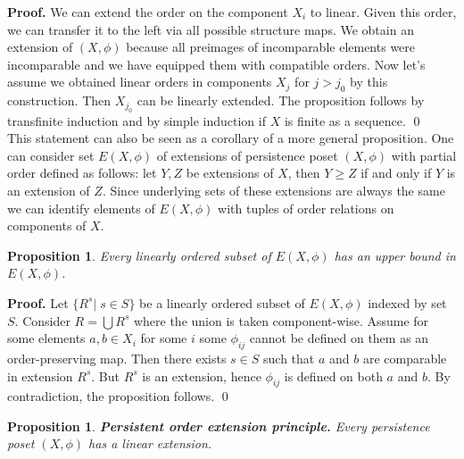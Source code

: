\documentclass[english,12pt]{article}
\newcounter{stmcounter}[section]
\numberwithin{equation}{section}
\newtheorem{proposition}[stmcounter]{Proposition}
\theoremstyle{definition}
\theoremstyle{remark}
\newenvironment{pf}{\noindent\textbf{Proof.}}{\qed}
\renewcommand{\geq}{\geqslant}
\begin{document}
\begin{pf}
  We can extend the order on the component $X_i$ to linear. Given this order, we can transfer it to the left via all possible structure maps. We obtain an extension of $(X,\phi)$ because all preimages of incomparable elements were incomparable and we have equipped them with compatible orders. Now let's assume we obtained linear orders in components $X_j$ for $j > j_0$ by this construction. Then $X_{j_0}$ can be linearly extended. The proposition follows by transfinite induction and by simple induction if $X$ is finite as a sequence.
\end{pf}\\

This statement can also be seen as a corollary of a more general proposition.
One can consider set $E(X,\phi)$ of extensions of persistence poset $(X,\phi)$ with partial order defined as follows: let $Y, Z$ be extensions of $X$, then $Y \geq Z$ if and only if $Y$ is an extension of $Z$. Since underlying sets of these extensions are always the same we can identify elements of $E(X,\phi)$ with tuples of order relations on components of $X$.

\begin{proposition}
  \label{Zorn_cond}
  Every linearly ordered subset of $E(X,\phi)$ has an upper bound in $E(X,\phi)$.
\end{proposition}

\begin{pf}
  Let $\{R^s|\;s \in S\}$ be a linearly ordered subset of $E(X,\phi)$ indexed by set $S$. Consider $R = \bigcup R^s$ where the union is taken component-wise. Assume for some elements $a, b \in X_i$ for some $i$ some $\phi_{ij}$ cannot be defined on them as an order-preserving map. Then there exists $s \in S$ such that $a$ and $b$ are comparable in extension $R^s$. But $R^s$ is an extension, hence $\phi_{ij}$ is defined on both $a$ and $b$. By contradiction, the proposition follows.
\end{pf}

\begin{proposition}
  \textbf{Persistent order extension principle.} Every persistence poset $(X,\phi)$ has a linear extension.
\end{proposition}
\end{document}

